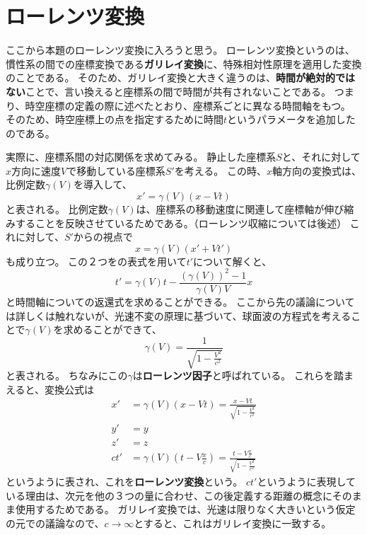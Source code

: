 \documentclass[a4paper]{jsreport}
\begin{document}
        \section{ローレンツ変換}
            ここから本題のローレンツ変換に入ろうと思う。
            ローレンツ変換というのは、慣性系の間での座標変換である\textbf{ガリレイ変換}に、特殊相対性原理を適用した変換のことである。
            そのため、ガリレイ変換と大きく違うのは、\textbf{時間が絶対的ではない}ことで、言い換えると座標系の間で時間が共有されないことである。
            つまり、時空座標の定義の際に述べたとおり、座標系ごとに異なる時間軸をもつ。
            そのため、時空座標上の点を指定するために時間$t$というパラメータを追加したのである。\par
            実際に、座標系間の対応関係を求めてみる。
            静止した座標系$S$と、それに対して$x$方向に速度$V$で移動している座標系$S'$を考える。
            この時、$x$軸方向の変換式は、比例定数$\gamma(V)$を導入して、
            \begin{equation}
                x' = \gamma(V)(x - Vt)
            \end{equation}
            と表される。
            比例定数$\gamma(V)$は、座標系の移動速度に関連して座標軸が伸び縮みすることを反映させているためである。（ローレンツ収縮については後述）
            これに対して、$S'$からの視点で
            \begin{equation}
                x = \gamma(V)(x' + Vt')
            \end{equation}
            も成り立つ。
            この２つをの表式を用いて$t'$について解くと、
            \begin{equation}
                t' = \gamma(V)t - \frac{(\gamma(V))^2 - 1}{\gamma(V)V}x               
            \end{equation}
            と時間軸についての返還式を求めることができる。
            ここから先の議論については詳しくは触れないが、光速不変の原理に基づいて、球面波の方程式を考えることで$\gamma(V)$を求めることができて、
            \begin{equation}
                \gamma(V) = \frac{1}{\sqrt{1 - \frac{V^2}{c^2}}}
            \end{equation}
            と表される。
            ちなみにこの$\gamma$は\textbf{ローレンツ因子}と呼ばれている。
            これらを踏まえると、変換公式は
            \begin{align}
                x' &= \gamma(V)(x - Vt) = \frac{x - Vt}{\sqrt{1 - \frac{V^2}{c^2}}} \\
                y' &= y \\
                z' &= z \\
                ct' & = \gamma(V) \left(t - V\frac{x}{c} \right)= \frac{t - V\frac{x}{c}}{\sqrt{1 - \frac{V^2}{c^2}}}
            \end{align}
            というように表され、これを\textbf{ローレンツ変換}という。
            $ct'$というように表現している理由は、次元を他の３つの量に合わせ、この後定義する距離の概念にそのまま使用するためである。
            ガリレイ変換では、光速は限りなく大きいという仮定の元での議論なので、$c \to \infty$とすると、これはガリレイ変換に一致する。
\end{document}
